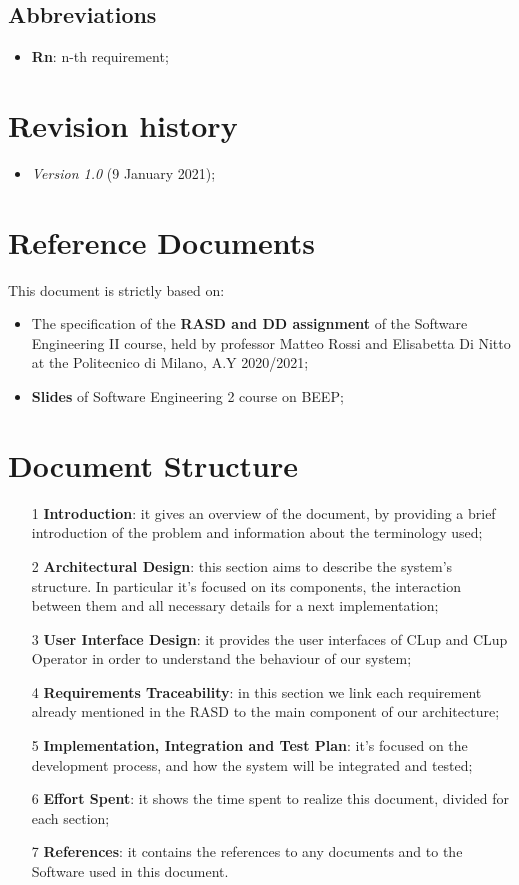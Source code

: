 \subsection{Abbreviations}
\begin{itemize}
\item \textbf{Rn}: n-th requirement;
\end{itemize}


\section{Revision history}
\begin{itemize}
\item \textit{Version 1.0} (9 January 2021);
\end{itemize}
\section{Reference Documents}
This document is strictly based on:
\begin{itemize}
\item The specification of the \textbf{RASD and DD assignment} of the Software Engineering II course, held by professor Matteo Rossi and Elisabetta Di Nitto at the Politecnico di Milano, A.Y 2020/2021;
\item \textbf{Slides} of Software Engineering 2 course on BEEP;
\end{itemize}
\section{Document Structure}
\begin{itemize}
\item[1]\textbf{Introduction}: it gives an overview of the document, by providing a brief introduction of the problem and information about the terminology used;
\item[2]\textbf{Architectural Design}: this section aims to describe the system’s structure. In particular it's focused on its components, the interaction between them and all necessary details for a next implementation; 
\item[3]\textbf{User Interface Design}: it provides the user interfaces of CLup and CLup Operator in order to understand the behaviour of our system; 
\item[4]\textbf{Requirements Traceability}: in this section we link each requirement already mentioned in the RASD to the main component of our architecture;
\item[5]\textbf{Implementation, Integration and Test Plan}: it's focused on the development process, and how the system will be integrated and tested;
\item[6]\textbf{Effort Spent}: it shows the time spent to realize this document, divided for each section;
\item[7]\textbf{References}: it contains the references to any documents and to the Software used in this document.
\end{itemize}


